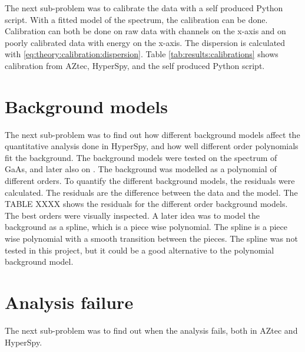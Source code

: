 The next sub-problem was to calibrate the data with a self produced Python script.
With a fitted model of the spectrum, the calibration can be done.
Calibration can both be done on raw data with channels on the x-axis and on poorly calibrated data with energy on the x-axis.
The dispersion is calculated with \cref{eq:theory:calibration:dispersion}.
Table \cref{tab:results:calibrations} shows calibration from AZtec, HyperSpy, and the self produced Python script.



%
%
\section{Background models}
\label{sec:discussion:background}

The next sub-problem was to find out how different background models affect the quantitative analysis done in HyperSpy, and how well different order polynomials fit the background.
The background models were tested on the spectrum of GaAs, and later also on .
The background was modelled as a polynomial of different orders.
To quantify the different background models, the residuals were calculated.
The residuals are the difference between the data and the model.
The TABLE XXXX  shows the residuals for the different order background models.
The best orders were visually inspected.
A later idea was to model the background as a spline, which is a piece wise polynomial.
The spline is a piece wise polynomial with a smooth transition between the pieces.
The spline was not tested in this project, but it could be a good alternative to the polynomial background model.



%
%
\section{Analysis failure}
\label{sec:discussion:failure}

The next sub-problem was to find out when the analysis fails, both in AZtec and HyperSpy.







